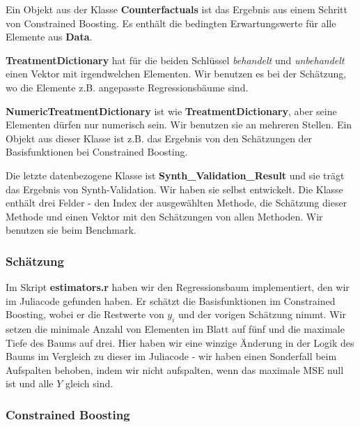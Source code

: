 \documentclass[12pt,a4paper,twoside]{scrartcl}
\numberwithin{equation}{section}
\begin{document}
\noindent
Ein Objekt aus der Klasse \textbf{Counterfactuals} ist das Ergebnis aus einem Schritt von Constrained Boosting. Es enthält die bedingten Erwartungswerte für alle Elemente aus \textbf{Data}.\par 

\noindent
\textbf{TreatmentDictionary} hat für die beiden Schlüssel \emph{behandelt} und \emph{unbehandelt} einen Vektor mit irgendwelchen Elementen. Wir benutzen es bei der Schätzung, wo die Elemente z.B. angepasste Regressionsbäume sind.\par	

\noindent
\textbf{NumericTreatmentDictionary} ist wie \textbf{TreatmentDictionary}, aber seine Elementen dürfen nur numerisch sein. Wir benutzen sie an mehreren Stellen. Ein Objekt aus dieser Klasse ist z.B. das Ergebnis von den Schätzungen der Basisfunktionen bei Constrained Boosting.\par

\noindent
Die letzte datenbezogene Klasse ist \textbf{Synth\_Validation\_Result} und sie trägt das Ergebnis von Synth-Validation. Wir haben sie selbst entwickelt. Die Klasse enthält drei Felder - den Index der ausgewählten Methode, die Schätzung dieser Methode und einen Vektor mit den Schätzungen von allen Methoden. Wir benutzen sie beim Benchmark. \par

\subsubsection{Schätzung}\label{subsubsec:schätung}
Im Skript \textbf{estimators.r} haben wir den Regressionsbaum implementiert, den wir im Juliacode gefunden haben. Er schätzt die Basisfunktionen im Constrained Boosting, wobei er die Restwerte von $y_i$ und der vorigen Schätzung nimmt. Wir setzen die minimale Anzahl von Elementen im Blatt auf fünf und die maximale Tiefe des Baums auf drei. Hier haben wir eine winzige Änderung in der Logik des Baums im Vergleich zu dieser im Juliacode - wir haben einen Sonderfall beim Aufspalten behoben, indem wir nicht aufspalten, wenn das maximale MSE null ist und alle $Y$ gleich sind.\par

\subsubsection{Constrained Boosting}\label{subsubsec:constrainedBoosting}
\end{document}
